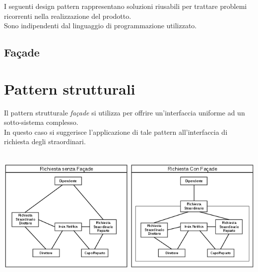\documentclass{scrreprt}
\begin{document}
I seguenti design pattern rappresentano soluzioni riusabili per trattare problemi ricorrenti nella realizzazione del prodotto.\\
Sono indipendenti dal linguaggio di programmazione utilizzato.
\subsection{Façade}
\section{Pattern strutturali}
Il pattern strutturale \textit{façade} si utilizza per offrire un’interfaccia uniforme ad un sotto-sistema complesso.\\
In questo caso si suggerisce l'applicazione di tale pattern all'interfaccia di richiesta degli straordinari.\\\\

	{\centering
	\hspace*{-2.23cm}
	\includegraphics[scale=0.8]{facade}\par
	}






\pagebreak
\blankpage{}
\end{document}
